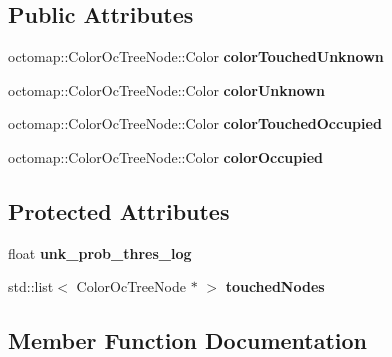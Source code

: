\subsection*{Public Attributes}
\begin{DoxyCompactItemize}
\item 
octomap\+::\+Color\+Oc\+Tree\+Node\+::\+Color {\bfseries color\+Touched\+Unknown}\hypertarget{classCOctreeVPL_a31d135d73813983ae78bf2b1763058ba}{}\label{classCOctreeVPL_a31d135d73813983ae78bf2b1763058ba}

\item 
octomap\+::\+Color\+Oc\+Tree\+Node\+::\+Color {\bfseries color\+Unknown}\hypertarget{classCOctreeVPL_afec2c69ea1c4c294a0b19d0d688cb95d}{}\label{classCOctreeVPL_afec2c69ea1c4c294a0b19d0d688cb95d}

\item 
octomap\+::\+Color\+Oc\+Tree\+Node\+::\+Color {\bfseries color\+Touched\+Occupied}\hypertarget{classCOctreeVPL_a9b80505c176da643abab260d36b0a8ca}{}\label{classCOctreeVPL_a9b80505c176da643abab260d36b0a8ca}

\item 
octomap\+::\+Color\+Oc\+Tree\+Node\+::\+Color {\bfseries color\+Occupied}\hypertarget{classCOctreeVPL_a9e4a135bf33774a080eee50a082c74ac}{}\label{classCOctreeVPL_a9e4a135bf33774a080eee50a082c74ac}

\end{DoxyCompactItemize}
\subsection*{Protected Attributes}
\begin{DoxyCompactItemize}
\item 
float {\bfseries unk\+\_\+prob\+\_\+thres\+\_\+log}\hypertarget{classCOctreeVPL_a1a2ec1493d8aa21c38210a0d7cb03956}{}\label{classCOctreeVPL_a1a2ec1493d8aa21c38210a0d7cb03956}

\item 
std\+::list$<$ Color\+Oc\+Tree\+Node $\ast$ $>$ {\bfseries touched\+Nodes}\hypertarget{classCOctreeVPL_ab4c73046dc8c049c8133fddffb93e09d}{}\label{classCOctreeVPL_ab4c73046dc8c049c8133fddffb93e09d}

\end{DoxyCompactItemize}


\subsection{Member Function Documentation}

